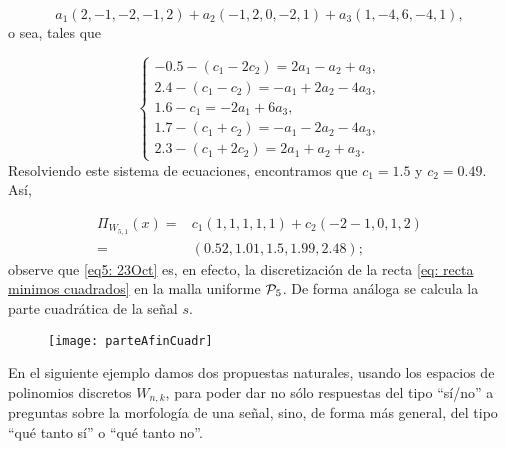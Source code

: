 \begin{ejemplo}
\[
a_{1}(2,-1,-2,-1,2)+a_{2}(-1,2,0,-2,1)
+ a_{3}(1,-4,6,-4,1),
\]
\noindent
o sea, tales que

\begin{equation*}
\begin{cases}
-0.5-(c_{1}-2c_{2})=2a_{1}-a_{2}+a_{3}, \\
2.4-(c_{1}-c_{2})=-a_{1}+2a_{2}-4a_{3}, \\
1.6-c_{1}=-2a_{1}+6a_{3},\\
1.7-(c_{1}+c_{2})=-a_{1}-2a_{2}-4a_{3}, \\
2.3-(c_{1}+2c_{2})=2a_{1}+a_{2}+a_{3}.
\end{cases}
\end{equation*}
Resolviendo este sistema
de ecuaciones, encontramos que
$c_{1}=1.5$ y $c_{2}=0.49$. Así,




\begin{align}
\label{eq5: 23Oct}
\Pi_{W_{5,1}}(x) =& c_{1} (1,1,1,1,1) + c_{2}(-2-1,0,1,2) \nonumber \\
= & (0.52, 1.01, 1.5, 1.99, 2.48 );
\end{align}
observe que \eqref{eq5: 23Oct} es, 
en efecto, la discretización de 
la recta \eqref{eq: recta minimos cuadrados}
en la malla uniforme $\mathcal{P}_{5}$.
De forma análoga se calcula la parte cuadrática de
la señal $s$.

\begin{figure}[H]
	\centering
	\texttt{[image: parteAfinCuadr]}
\end{figure}	
\final
\end{ejemplo}





En el siguiente ejemplo 
damos dos propuestas naturales,
usando los espacios de polinomios discretos $W_{n,k}$,
para poder dar no sólo respuestas del tipo
``sí/no'' a preguntas sobre la morfología de una señal, sino,
de forma más general, del tipo ``qué tanto sí'' o
``qué tanto no''.




